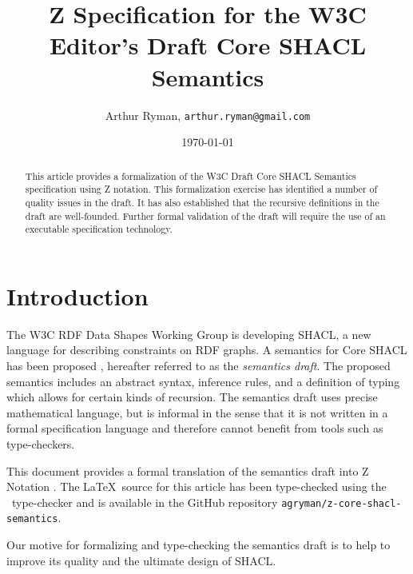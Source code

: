 \documentclass{article}
\title{Z Specification for the W3C Editor's Draft Core SHACL Semantics}
\author{Arthur Ryman, {\tt arthur.ryman@gmail.com}}
\date{\today}
\begin{document}


\maketitle

\begin{abstract}
This article provides a formalization of the W3C Draft Core SHACL Semantics specification using Z notation.
This formalization exercise has identified a number of quality issues in the draft.
It has also established that the recursive definitions in the draft are well-founded.
Further formal validation of the draft will require the use of an executable specification technology.
\end{abstract}

\section{Introduction}
\label{sec-introduction}
The W3C RDF Data Shapes Working Group \cite{w3c:shapeswg} is developing SHACL, a new language for describing constraints on RDF graphs.
A semantics for Core SHACL has been proposed \cite{iovka:core-shacl}, hereafter referred to as the {\em semantics draft}.
The proposed semantics includes an abstract syntax, inference rules, and a definition of typing which allows for certain kinds of recursion.
The semantics draft uses precise mathematical language, but is informal in the sense that it is not written in a formal specification language
and therefore cannot benefit from tools such as type-checkers.

This document provides a formal translation of the semantics draft into Z Notation  \cite{spivey:zrm}.
The \LaTeX\ source for this article has been type-checked using the \fuzz\ type-checker \cite{spivey:fuzz}
and is available in the GitHub repository  \cite{agryman:z-core-shacl-semantics}
{\tt agryman/z-core-shacl-semantics}.

Our motive for formalizing and type-checking the semantics draft is to help to improve its quality
and the ultimate design of SHACL. 
\end{document}
